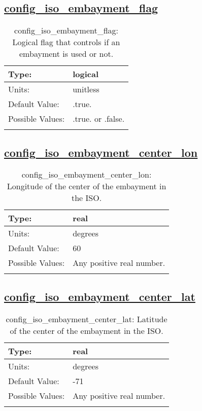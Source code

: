 \subsection[config\_iso\_embayment\_flag]{\hyperref[sec:nm_tab_iso]{config\_iso\_embayment\_flag}}
\label{subsec:nm_sec_config_iso_embayment_flag}
\begin{center}
\begin{longtable}{| p{2.0in} || p{4.0in} |}
    \hline
    Type: & logical \\
    \hline
    Units: & \si{unitless} \\
    \hline
    Default Value: & .true. \\
    \hline
    Possible Values: & .true. or .false. \\
    \hline
    \caption{config\_iso\_embayment\_flag: Logical flag that controls if an embayment is used or not.}
\end{longtable}
\end{center}
\subsection[config\_iso\_embayment\_center\_lon]{\hyperref[sec:nm_tab_iso]{config\_iso\_embayment\_center\_lon}}
\label{subsec:nm_sec_config_iso_embayment_center_lon}
\begin{center}
\begin{longtable}{| p{2.0in} || p{4.0in} |}
    \hline
    Type: & real \\
    \hline
    Units: & \si{degrees} \\
    \hline
    Default Value: & 60 \\
    \hline
    Possible Values: & Any positive real number. \\
    \hline
    \caption{config\_iso\_embayment\_center\_lon: Longitude of the center of the embayment in the ISO.}
\end{longtable}
\end{center}
\subsection[config\_iso\_embayment\_center\_lat]{\hyperref[sec:nm_tab_iso]{config\_iso\_embayment\_center\_lat}}
\label{subsec:nm_sec_config_iso_embayment_center_lat}
\begin{center}
\begin{longtable}{| p{2.0in} || p{4.0in} |}
    \hline
    Type: & real \\
    \hline
    Units: & \si{degrees} \\
    \hline
    Default Value: & -71 \\
    \hline
    Possible Values: & Any positive real number. \\
    \hline
    \caption{config\_iso\_embayment\_center\_lat: Latitude of the center of the embayment in the ISO.}
\end{longtable}
\end{center}
